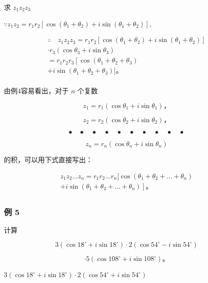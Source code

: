 求 \(z_{1}z_{2}z_{3}\)

\(\because z_{1}z_{2} = r_{1}r_{2}[\cos (\theta_{1} + \theta_{2}) + i\sin (\theta_{1} + \theta_{2})],\)

\[
\begin{array}{l} \therefore \quad z _ {1} z _ {2} z _ {3} = r _ {1} r _ {2} [ \cos (\theta_ {1} + \theta_ {2}) + i \sin (\theta_ {1} + \theta_ {2}) ] \\ \cdot r _ {3} \left(\cos \theta_ {3} + i \sin \theta_ {3}\right) \\ = r _ {1} r _ {2} r _ {3} \left[ \cos \left(\theta_ {1} + \theta_ {2} + \theta_ {3}\right) \right. \\ + i \sin (\theta_ {1} + \theta_ {2} + \theta_ {3}) ]\text{。} \\ \end{array}
\]

由例4容易看出，对于 \(n\) 个复数

\[
z _ {1} = r _ {1} \left(\cos \theta_ {1} + i \sin \theta_ {1}\right)\text{，}
\]

\[
z _ {2} = r _ {2} \left(\cos \theta_ {2} + i \sin \theta_ {2}\right)\text{，}
\]

\[
\bullet \quad \bullet \quad \bullet \quad \bullet \quad \bullet \quad \bullet \quad \bullet \quad \bullet \quad \bullet \quad \bullet \tag {1.1}
\]

\[
z _ {n} = r _ {n} \left(\cos \theta_ {n} + i \sin \theta_ {n}\right)
\]

的积，可以用下式直接写出：

\[
\begin{array}{l} z _ {1} z _ {2} \dots z _ {n} = r _ {1} r _ {2} \dots r _ {n} [ \cos (\theta_ {1} + \theta_ {2} + \dots + \theta_ {n}) \\ \left. + i \sin \left(\theta_ {1} + \theta_ {2} + \dots + \theta_ {n}\right) \right]\text{。} \\ \end{array}
\]

\subsubsection{例 5}

计算

\[
3 (\cos 18 ^ {\circ} + i \sin 18 ^ {\circ}) \cdot 2 (\cos 54 ^ {\circ} - i \sin 54 ^ {\circ})
\]

\[
\cdot 5 (\cos 108 ^ {\circ} + i \sin 108 ^ {\circ})\text{。}
\]

\(3(\cos 18^{\circ} + i\sin 18^{\circ})\cdot 2(\cos 54^{\circ} + i\sin 54^{\circ})\)

